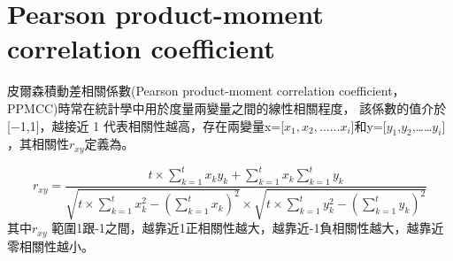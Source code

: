 \chapter{Pearson product-moment correlation coefficient}
\label{chapter:intro}
皮爾森積動差相關係數(Pearson product-moment correlation coefficient，PPMCC)時常在統計學中用於度量兩變量之間的線性相關程度， 該係數的值介於[−1,1]，越接近 1 代表相關性越高，存在兩變量x=[$x_1,x_2,……x_i$]和y=[$y_1$,$y_2$,……$y_i$] ，其相關性$r_{xy}$定義為。

\begin{equation}
\label{eqn:Pearson }
    r_{xy}=\frac{t\times\sum_{k=1}^{t}x_ky_k+\sum_{k=1}^{t}x_k\sum_{k=1}^{t}y_k}{\sqrt{t\times \sum_{k=1}^{t}x_k^2-(\sum_{k=1}^{t}x_k)^2}\times\sqrt{t\times\sum_{k=1}^{t}y_k^2-(\sum_{k=1}^{t}y_k)^2}}
\end{equation}
其中$r_{xy}$ 範圍1跟-1之間，越靠近1正相關性越大，越靠近-1負相關性越大，越靠近零相關性越小。
    